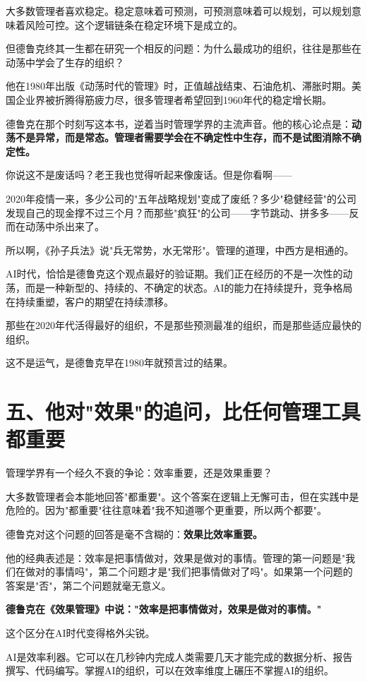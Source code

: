大多数管理者喜欢稳定。稳定意味着可预测，可预测意味着可以规划，可以规划意味着风险可控。这个逻辑链条在稳定环境下是成立的。

但德鲁克终其一生都在研究一个相反的问题：为什么最成功的组织，往往是那些在动荡中学会了生存的组织？

他在1980年出版《动荡时代的管理》时，正值越战结束、石油危机、滞胀时期。美国企业界被折腾得筋疲力尽，很多管理者希望回到1960年代的稳定增长期。

德鲁克在那个时刻写这本书，逆着当时管理学界的主流声音。他的核心论点是：\textbf{动荡不是异常，而是常态。管理者需要学会在不确定性中生存，而不是试图消除不确定性。}

你说这不是废话吗？老王我也觉得听起来像废话。但是你看啊——

2020年疫情一来，多少公司的"五年战略规划"变成了废纸？多少"稳健经营"的公司发现自己的现金撑不过三个月？而那些"疯狂"的公司——字节跳动、拼多多——反而在动荡中杀出来了。

所以啊，《孙子兵法》说"兵无常势，水无常形"。管理的道理，中西方是相通的。

AI时代，恰恰是德鲁克这个观点最好的验证期。我们正在经历的不是一次性的动荡，而是一种新型的、持续的、不确定的状态。AI的能力在持续提升，竞争格局在持续重塑，客户的期望在持续漂移。

那些在2020年代活得最好的组织，不是那些预测最准的组织，而是那些适应最快的组织。

这不是运气，是德鲁克早在1980年就预言过的结果。


\section{五、他对"效果"的追问，比任何管理工具都重要}


管理学界有一个经久不衰的争论：效率重要，还是效果重要？

大多数管理者会本能地回答"都重要"。这个答案在逻辑上无懈可击，但在实践中是危险的。因为"都重要"往往意味着"我不知道哪个更重要，所以两个都要"。

德鲁克对这个问题的回答是毫不含糊的：\textbf{效果比效率重要。}

他的经典表述是：效率是把事情做对，效果是做对的事情。管理的第一问题是"我们在做对的事情吗"，第二个问题才是"我们把事情做对了吗"。如果第一个问题的答案是"否"，第二个问题就毫无意义。

\textbf{德鲁克在《效果管理》中说："效率是把事情做对，效果是做对的事情。"}

这个区分在AI时代变得格外尖锐。

AI是效率利器。它可以在几秒钟内完成人类需要几天才能完成的数据分析、报告撰写、代码编写。掌握AI的组织，可以在效率维度上碾压不掌握AI的组织。


